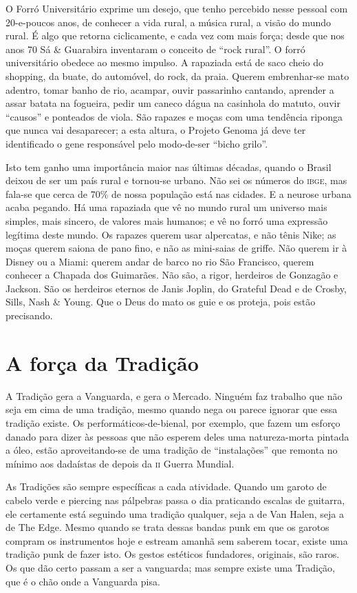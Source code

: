 O Forró Universitário exprime um desejo, que tenho percebido nesse
pessoal com 20-e-poucos anos, de conhecer a vida rural, a música
rural, a visão do mundo rural. É algo que retorna ciclicamente, e
cada vez com mais força; desde que nos anos 70 Sá \& Guarabira
inventaram o conceito de “rock rural”. O forró universitário obedece
ao mesmo impulso. A rapaziada está de saco cheio do shopping, da
buate, do automóvel, do rock, da praia. Querem embrenhar-se mato
adentro, tomar banho de rio, acampar, ouvir passarinho cantando,
aprender a assar batata na fogueira, pedir um caneco dágua na
casinhola do matuto, ouvir “causos” e ponteados de viola. São rapazes
e moças com uma tendência riponga que nunca vai desaparecer; a esta
altura, o Projeto Genoma já deve ter identificado o gene responsável
pelo modo-de-ser “bicho grilo”. 

Isto tem ganho uma importância maior nas últimas décadas, quando o
Brasil deixou de ser um país rural e tornou-se urbano. Não sei os
números do \textsc{ibge}, mas fala-se que cerca de 70\% de nossa população
está nas cidades. E a neurose urbana acaba pegando. Há uma rapaziada
que vê no mundo rural um universo mais simples, mais sincero, de
valores mais humanos; e vê no forró uma expressão legítima deste
mundo. Os rapazes querem usar alpercatas, e não tênis Nike; as moças
querem saiona de pano fino, e não as mini-saias de griffe. Não querem
ir à Disney ou a Miami: querem andar de barco no rio São Francisco,
querem conhecer a Chapada dos Guimarães. Não são, a rigor, herdeiros
de Gonzagão e Jackson. São os herdeiros eternos de Janis Joplin, do
Grateful Dead e de Crosby, Sills, Nash \& Young. Que o Deus do mato
os guie e os proteja, pois estão precisando.

\chapter{A força da Tradição}

A Tradição gera a Vanguarda, e gera o Mercado. Ninguém faz trabalho
que não seja em cima de uma tradição, mesmo quando nega ou parece
ignorar que essa tradição existe. Os performáticos-de-bienal, por
exemplo, que fazem um esforço danado para dizer às pessoas que não
esperem deles uma natureza-morta pintada a óleo, estão
aproveitando-se de uma tradição de “instalações” que remonta no
mínimo aos dadaístas de depois da \textsc{ii} Guerra Mundial.

As Tradições são sempre específicas a cada atividade. Quando um garoto
de cabelo verde e piercing nas pálpebras passa o dia praticando
escalas de guitarra, ele certamente está seguindo uma tradição
qualquer, seja a de Van Halen, seja a de The Edge. Mesmo quando se
trata dessas bandas punk em que os garotos compram os instrumentos
hoje e estream amanhã sem saberem tocar, existe uma tradição punk de
fazer isto. Os gestos estéticos fundadores, originais, são raros. Os
que dão certo passam a ser a vanguarda; mas sempre existe uma
Tradição, que é o chão onde a Vanguarda pisa.

